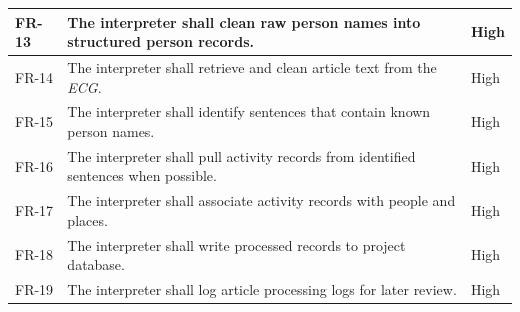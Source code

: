 \begin{longtable}{|p{}|p{}|p{}|}
	\hline
	FR-13       & The interpreter shall clean raw person names into structured person records.                  & High              \\
	\hline
	FR-14       & The interpreter shall retrieve and clean article text from the \textit{ECG}.                  & High              \\
	\hline
	FR-15       & The interpreter shall identify sentences that contain known person names.                     & High              \\
	\hline
	FR-16       & The interpreter shall pull activity records from identified sentences when possible.          & High              \\
	\hline
	FR-17       & The interpreter shall associate activity records with people and places.                      & High              \\
	\hline
	FR-18       & The interpreter shall write processed records to project database.                            & High              \\
	\hline
	FR-19       & The interpreter shall log article processing logs for later review.                           & High              \\
	\hline
\end{longtable}

